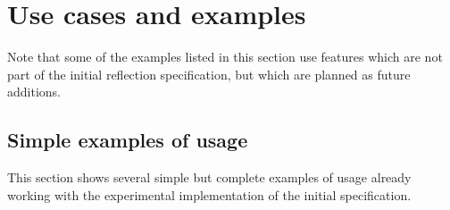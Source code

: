 \section{Use cases and examples}
\label{use-cases-examples}

Note that some of the examples listed in this section use features which
are not part of the initial reflection specification, but which are planned
as future additions.










\subsection{Simple examples of usage}

This section shows several simple but complete examples of usage already working
with the experimental implementation of the initial specification.









